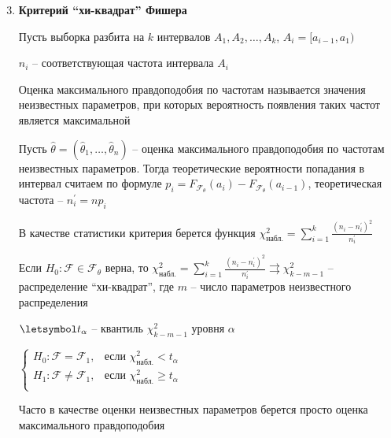 \begin{enumerate}[label*=\Roman*. ]
    \setcounter{enumi}{2}

    \hypertarget{chi_square_fishers_criterion}{}

    \item \textbf{Критерий \enquote{хи-квадрат} Фишера}

    Пусть выборка разбита на $k$ интервалов $A_1, A_2, \dots, A_k$, $A_i = [a_{i - 1}, a_1)$

    $n_i$ -- соответствующая частота интервала $A_i$

    \Def Оценка максимального правдоподобия по частотам называется значения неизвестных параметров,
    при которых вероятность появления таких частот является максимальной

    Пусть $\hat \theta = (\hat \theta_1, \dots, \hat \theta_n)$ -- оценка максимального правдоподобия 
    по частотам неизвестных параметров. Тогда теоретические вероятности попадания в интервал считаем по формуле 
    $p_i = F_{\mathcal{F}_\theta} (a_i) - F_{\mathcal{F}_\theta} (a_{i - 1})$, теоретическая частота -- $n_i^\prime = n p_i$

    В качестве статистики критерия берется функция $\chi^2_\text{набл.} = \sum_{i = 1}^k \frac{(n_i - n_i^\prime)^2}{n_i^\prime}$

    \begin{MyTheorem}
        
        Если $H_0 : \mathcal{F} \in \mathcal{F}_\theta$ верна, 
        то $\chi^2_\text{набл.} = \sum_{i = 1}^k \frac{(n_i - n_i^\prime)^2}{n_i^\prime} \rightrightarrows \chi^2_{k - m - 1}$ -- 
        распределение \enquote{хи-квадрат}, где $m$ -- число параметров неизвестного распределения
    \end{MyTheorem}
    
    $\letsymbol t_\alpha$ -- квантиль $\chi^2_{k - m - 1}$ уровня $\alpha$

    $\begin{cases}
        H_0 : \mathcal{F} = \mathcal{F}_1, & \text{если } \chi^2_\text{набл.} < t_\alpha \\
        H_1 : \mathcal{F} \neq \mathcal{F}_1, & \text{если } \chi^2_\text{набл.} \geq t_\alpha \\
    \end{cases}$

    \Nota Часто в качестве оценки неизвестных параметров берется просто оценка максимального правдоподобия
    
\end{enumerate}

